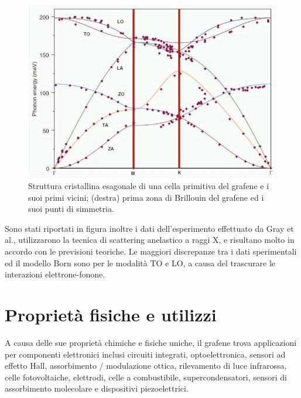 \documentclass[a4paper,titlepage]{book}
\begin{document}
 \begin{figure}[h!] 
 	\centering
 	\includegraphics[width=0.8\columnwidth]{phografe.png}
 	\caption{ 	\label{fog}
 		Struttura cristallina esagonale di una cella primitiva del grafene e i suoi primi vicini; (destra) prima zona di Brillouin del grafene ed i suoi punti di simmetria.
 	}
 \end{figure}
Sono stati riportati in figura inoltre i dati dell'esperimento effettuato da Gray et al.\cite{Gray}, utilizzarono la tecnica di scattering anelastico a raggi X, e risultano molto in accordo con le previsioni teoriche.
Le maggiori discrepanze tra i dati sperimentali ed il modello Born sono per le modalità TO e LO, a causa del trascurare le interazioni elettrone-fonone.

\section{Proprietà fisiche e utilizzi}
A causa delle sue proprietà chimiche e fisiche uniche, il grafene trova applicazioni per componenti elettronici inclusi circuiti integrati, optoelettronica, sensori ad effetto Hall, assorbimento / modulazione ottica, rilevamento di luce infrarossa, celle fotovoltaiche, elettrodi, celle a combustibile, supercondensatori, sensori di assorbimento molecolare e dispositivi piezoelettrici.\\
\end{document}
